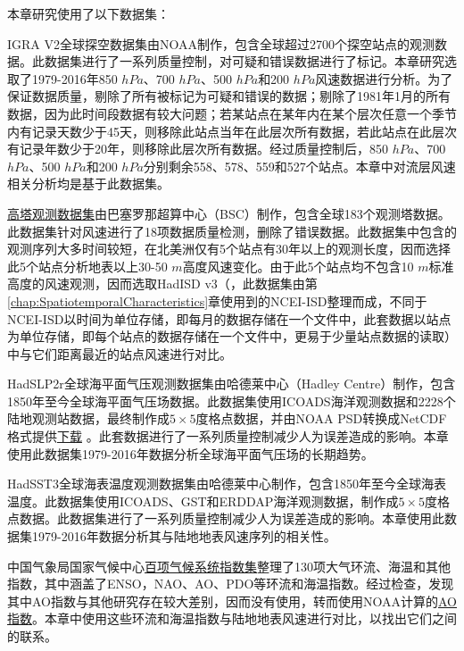 本章研究使用了以下数据集：

IGRA V2全球探空数据集\citep{durre2006overview}由NOAA制作，包含全球超过2700个探空站点的观测数据。此数据集进行了一系列质量控制，对可疑和错误数据进行了标记。本章研究选取了1979-2016年850 $hPa$、700 $hPa$、500 $hPa$和200 $hPa$风速数据进行分析。为了保证数据质量，剔除了所有被标记为可疑和错误的数据；剔除了1981年1月的所有数据，因为此时间段数据有较大问题\citep{vautard2010northern}；若某站点在某年内在某个层次任意一个季节内有记录天数少于45天，则移除此站点当年在此层次所有数据，若此站点在此层次有记录年数少于20年，则移除此层次所有数据。经过质量控制后，850 $hPa$、700 $hPa$、500 $hPa$和200 $hPa$分别剩余558、578、559和527个站点。本章中对流层风速相关分析均是基于此数据集。

\href{https://b2share.eudat.eu/records/159158152f4d4be79559e2f3f6b1a410}{高塔观测数据集}由巴塞罗那超算中心（BSC）制作，包含全球183个观测塔数据。此数据集针对风速进行了18项数据质量检测，删除了错误数据。此数据集中包含的观测序列大多时间较短，在北美洲仅有5个站点有30年以上的观测长度，因而选择此5个站点分析地表以上30-50 $m$高度风速变化。由于此5个站点均不包含10 $m$标准高度的风速观测，因而选取HadISD v3（\citep{dunn2012hadisd:}，此数据集由第\ref{chap:SpatiotemporalCharacteristics}章使用到的NCEI-ISD整理而成，不同于NCEI-ISD以时间为单位存储，即每月的数据存储在一个文件中，此套数据以站点为单位存储，即每个站点的数据存储在一个文件中，更易于少量站点数据的读取）中与它们距离最近的站点风速进行对比。

HadSLP2r全球海平面气压观测数据集\citep{allan2006a}由哈德莱中心（Hadley Centre）制作，包含1850年至今全球海平面气压场数据。此数据集使用ICOADS海洋观测数据和2228个陆地观测站数据，最终制作成$5 \times 5$度格点数据，并由NOAA PSD转换成NetCDF格式提供\href{https://www.esrl.noaa.gov/psd/gcos_wgsp/Gridded/data.hadslp2.html}{下载} 。此套数据进行了一系列质量控制减少人为误差造成的影响。本章使用此数据集1979-2016年数据分析全球海平面气压场的长期趋势。

HadSST3全球海表温度观测数据集\citep{kennedy2011reassessing1,kennedy2011reassessing2}由哈德莱中心制作，包含1850年至今全球海表温度。此数据集使用ICOADS、GST和ERDDAP海洋观测数据，制作成$5 \times 5$度格点数据。此数据集进行了一系列质量控制减少人为误差造成的影响。本章使用此数据集1979-2016年数据分析其与陆地地表风速序列的相关性。

中国气象局国家气候中心\href{https://cmdp.ncc-cma.net/Monitoring/cn_index_130.php}{百项气候系统指数集}整理了130项大气环流、海温和其他指数，其中涵盖了ENSO，NAO、AO、PDO等环流和海温指数。经过检查，发现其中AO指数与其他研究存在较大差别，因而没有使用，转而使用NOAA计算的\href{https://www.ncdc.noaa.gov/teleconnections/ao/}{AO指数}。本章中使用这些环流和海温指数与陆地地表风速进行对比，以找出它们之间的联系。

